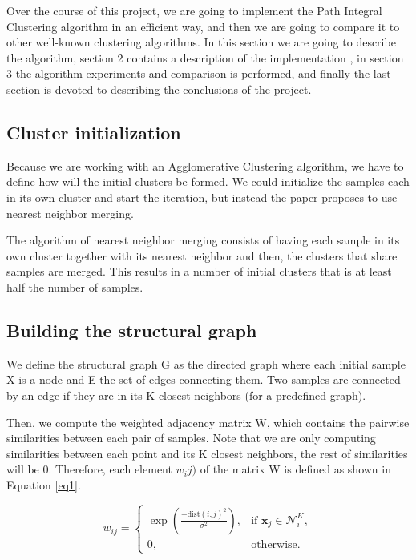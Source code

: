 \documentclass[
	10pt,
	parskip=half-,	
	paper=a4,
	english
	]{scrartcl}
\begin{document}
Over the course of this project, we are going to implement the Path Integral Clustering algorithm in an efficient way, and then we are going to compare it to other well-known clustering algorithms. In this section we are going to describe the algorithm, section 2 contains a description of the implementation , in section 3 the algorithm experiments and comparison is performed, and finally the last section is devoted to describing the conclusions of the project.

\subsection{Cluster initialization}

Because we are working with an Agglomerative Clustering algorithm, we have to define how will the initial clusters be formed. We could initialize the samples each in its own cluster and start the iteration, but instead the paper proposes to use nearest neighbor merging. 

The algorithm of nearest neighbor merging consists of having each sample in its own cluster together with its nearest neighbor and then, the clusters that share samples are merged. This results in a number of initial clusters that is at least half the number of samples.

\subsection{Building the structural graph}

We define the structural graph G as the directed graph where each initial sample X is a node and E the set of edges connecting them. Two samples are connected by an edge if they are in its K closest neighbors (for a predefined graph).

Then, we compute the weighted adjacency matrix W, which contains the pairwise similarities between each pair of samples. Note that we are only computing similarities between each point and its K closest neighbors, the rest of similarities will be 0. Therefore, each element \(w_ij)\) of the matrix W is defined as shown in Equation \ref{eq1}.

\begin{equation}
    w_{ij} =
    \begin{cases} 
    \exp \left( \frac{-\text{dist}(i,j)^2}{\sigma^2} \right), & \text{if } \mathbf{x}_j \in \mathcal{N}_i^K, \\
    0, & \text{otherwise}.
    \end{cases}
    \label{eq1}
\end{equation}
\end{document}
